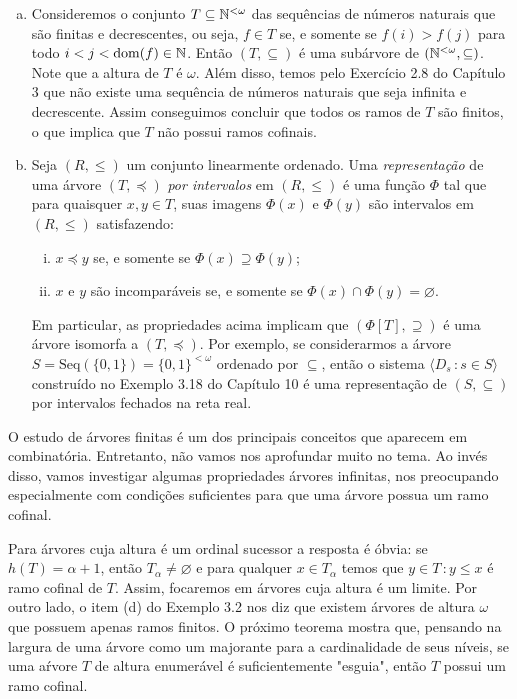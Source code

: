 \documentclass[a4paper]{article}
\begin{document}
\begin{exemplo}
\begin{enumerate}[(a)]
   \item Consideremos o conjunto
    \(T\subseteq \mathbb{N}^{<\omega}\)
     das sequências de números naturais que são finitas e
    decrescentes, ou seja, \(f\in T \) se, e somente se  \(f(i)>f(j)\)  para todo
    \(i<j<\operatorname{dom}(f)\in\mathbb{N}\).  Então \((T,\subseteq)\) é uma subárvore de
    \((\mathbb{N}^{<\omega},\subseteq)\). Note que a altura de  \(T\) é 
    \(\omega\). Além disso, temos pelo Exercício 2.8 do Capítulo 3 que não
    existe uma sequência de números naturais que seja infinita e decrescente.
    Assim conseguimos concluir que todos os ramos de \(T\) são finitos, o
    que implica que \(T\) não possui ramos cofinais.

  \item Seja \((R,\leq)\) um conjunto linearmente ordenado.
    Uma \emph{representação} de uma árvore \((T,\preceq)\)
    \emph{por intervalos} em \((R,\leq)\) é uma função \(\Phi\) tal que para
    quaisquer \(x,y\in T\),
    suas imagens \(\Phi(x)\) e \(\Phi(y)\) são intervalos em \((R,\leq)\) satisfazendo:
    \begin{enumerate}[(i)]
    \item \(x\preceq y\) se, e somente se \(\Phi(x)\supseteq\Phi(y)\); 
    \item \(x\) e \(y\) são incomparáveis se, e somente se \(\Phi(x)\cap\Phi(y) =\varnothing\).
    \end{enumerate}
    Em particular, as propriedades acima implicam que \((\Phi[T],\supseteq)\) é
    uma árvore isomorfa a \((T,\preceq)\). Por exemplo, se considerarmos
    a árvore \(S=\text{Seq}(\{0,1\})=\{0,1\}^{<\omega}\) ordenado por \(\subseteq\),
    então o sistema \(\langle D_s \,\colon s\in S\rangle\) construído no Exemplo
    3.18 do  Capítulo 10 é uma representação de \((S,\subseteq)\) por intervalos
    fechados na reta real.
    \end{enumerate}
  \end{exemplo}
  
  O estudo de árvores finitas é um dos  principais conceitos que aparecem em
  combinatória. Entretanto, não vamos nos aprofundar muito no tema. Ao invés
  disso, vamos investigar algumas propriedades árvores infinitas, nos preocupando
  especialmente com condições suficientes para que uma árvore possua um ramo cofinal.

  Para árvores cuja altura é um ordinal sucessor a resposta é óbvia: se \(h(T)=\alpha +1\),
  então \(T_\alpha\neq\varnothing\) e para qualquer \(x\in T_\alpha\) temos que
  \({{y\in T \,\colon y\leq x}}\) é ramo cofinal de \(T\). Assim, focaremos em
  árvores cuja altura é um limite. Por outro lado, o item (d) do Exemplo 3.2 nos diz que
  existem árvores de altura \(\omega\) que possuem apenas ramos finitos. O
  próximo teorema mostra que,  pensando na largura de uma árvore como um
  majorante para a cardinalidade de seus níveis, se uma aŕvore \(T\) de altura
  enumerável é suficientemente "esguia", então \(T\) possui um ramo cofinal.
\end{document}

